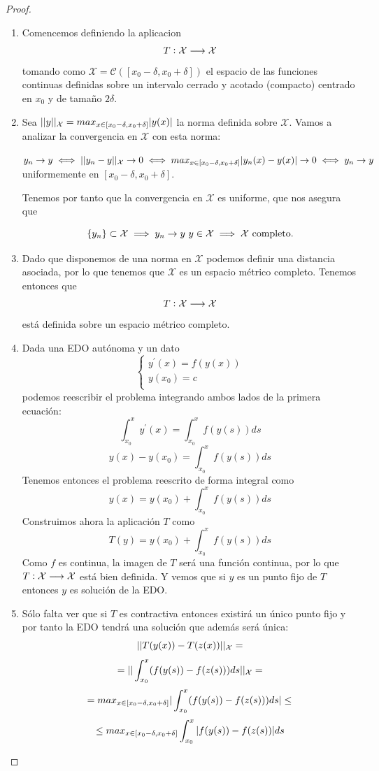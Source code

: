 \documentclass{mathnotes}
\begin{document}
\begin{proof}
\begin{enumerate}
\item Comencemos definiendo la aplicacion $$T: \mathcal{X} \longrightarrow \mathcal{X}$$ tomando como $\mathcal{X} = \mathcal{C}([x_0-\delta, x_0+\delta])$ el espacio de las funciones continuas definidas sobre un intervalo cerrado y acotado (compacto) centrado en $x_0$ y de tamaño $2\delta$.

\item Sea $||y||_\mathcal{X} = max_{x\in [x_0-\delta, x_0+\delta]} |y(x)|$ la norma definida sobre $\mathcal{X}$.
Vamos a analizar la convergencia en $\mathcal{X}$ con esta norma:

$y_n\to y \iff ||y_n-y||_\mathcal{X}\to 0 \iff max_{x\in [x_0-\delta, x_0+\delta]} |y_n(x)-y(x)|\to 0 \iff y_n\to y$ uniformemente en $[x_0-\delta, x_0+\delta]$.

Tenemos por tanto que la convergencia en $\mathcal{X}$ es uniforme, que nos asegura que 

$$\{ y_n \}\subset \mathcal{X}\implies y_n\to y\ y\in \mathcal{X} \implies \mathcal{X}\text{ completo.}$$

\item Dado que disponemos de una norma en $\mathcal{X}$ podemos definir una distancia asociada, por lo que tenemos que $\mathcal{X}$ es un espacio métrico completo. Tenemos entonces que $$T: \mathcal{X} \longrightarrow \mathcal{X}$$ está definida sobre un espacio métrico completo.

\item Dada una EDO autónoma y un dato 
$$
\left\lbrace
  \begin{array}{l}
     y^\prime(x) = f(y(x)) \\
     y(x_0) = c  \\
  \end{array}
  \right.
$$
podemos reescribir el problema integrando ambos lados de la primera ecuación:
$$\int_{x_0}^x y^\prime(x) = \int_{x_0}^x f(y(s))ds$$
$$ y(x) - y(x_0) = \int_{x_0}^x f(y(s))ds$$
Tenemos entonces el problema reescrito de forma integral como 
$$ y(x) = y(x_0) + \int_{x_0}^x f(y(s))ds$$
Construimos ahora la aplicación $T$ como
$$ T(y) = y(x_0) + \int_{x_0}^x f(y(s))ds$$
Como $f$ es continua, la imagen de $T$ será una función continua, por lo que $T: \mathcal{X} \longrightarrow \mathcal{X}$ está bien definida. Y vemos que si $y$ es un punto fijo de $T$ entonces $y$ es solución de la EDO.

\item Sólo falta ver que si $T$ es contractiva entonces existirá un único punto fijo y por tanto la EDO tendrá una solución que además será única:
$$||T(y(x)) - T(z(x))||_\mathcal{X} = $$
$$= ||\int_{x_0}^x (f(y(s)) - f(z(s)))ds||_\mathcal{X} = $$
$$= max_{x\in [x_0-\delta, x_0+\delta]} |\int_{x_0}^x (f(y(s)) - f(z(s)))ds| \leq $$
$$\leq max_{x\in [x_0-\delta, x_0+\delta]} \int_{x_0}^x |f(y(s)) - f(z(s))|ds$$


\end{enumerate}
\end{proof}
\end{document}
